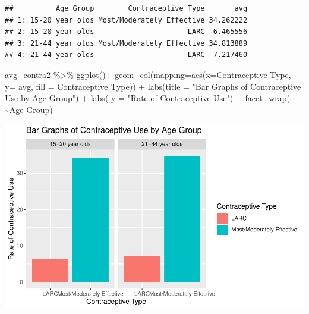 \documentclass[
]{article}
\newenvironment{Shaded}{\begin{snugshade}}{\end{snugshade}}
\newcommand{\AttributeTok}[1]{\textcolor[rgb]{0.77,0.63,0.00}{#1}}
\newcommand{\FunctionTok}[1]{\textcolor[rgb]{0.00,0.00,0.00}{#1}}
\newcommand{\NormalTok}[1]{#1}
\newcommand{\SpecialCharTok}[1]{\textcolor[rgb]{0.00,0.00,0.00}{#1}}
\newcommand{\StringTok}[1]{\textcolor[rgb]{0.31,0.60,0.02}{#1}}
\begin{document}
\begin{verbatim}
##          Age Group        Contraceptive Type       avg
## 1: 15-20 year olds Most/Moderately Effective 34.262222
## 2: 15-20 year olds                      LARC  6.465556
## 3: 21-44 year olds Most/Moderately Effective 34.813889
## 4: 21-44 year olds                      LARC  7.217460
\end{verbatim}

\begin{Shaded}
\begin{Highlighting}[]
\NormalTok{avg\_contra2 }\SpecialCharTok{\%\textgreater{}\%} 
  \FunctionTok{ggplot}\NormalTok{()}\SpecialCharTok{+}
  \FunctionTok{geom\_col}\NormalTok{(}\AttributeTok{mapping=}\FunctionTok{aes}\NormalTok{(}\AttributeTok{x=}\StringTok{\textasciigrave{}}\AttributeTok{Contraceptive Type}\StringTok{\textasciigrave{}}\NormalTok{, }\AttributeTok{y=}\NormalTok{ avg, }\AttributeTok{fill =} \StringTok{\textasciigrave{}}\AttributeTok{Contraceptive Type}\StringTok{\textasciigrave{}}\NormalTok{)) }\SpecialCharTok{+}
   \FunctionTok{labs}\NormalTok{(}\AttributeTok{title =} \StringTok{"Bar Graphs of Contraceptive Use by Age Group"}\NormalTok{) }\SpecialCharTok{+}
  \FunctionTok{labs}\NormalTok{( }\AttributeTok{y =} \StringTok{"Rate of Contraceptive Use"}\NormalTok{) }\SpecialCharTok{+}
    \FunctionTok{facet\_wrap}\NormalTok{( }\SpecialCharTok{\textasciitilde{}}\StringTok{\textasciigrave{}}\AttributeTok{Age Group}\StringTok{\textasciigrave{}}\NormalTok{)}
\end{Highlighting}
\end{Shaded}

\begin{center}\includegraphics[width=700px]{Report_files/figure-latex/unnamed-chunk-13-1} \end{center}
\end{document}

